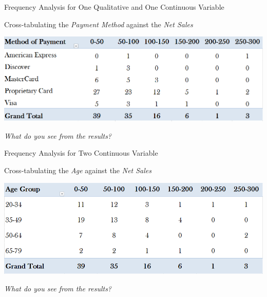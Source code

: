 \documentclass{beamer}
\begin{document}
\begin{frame}{Frequency Analysis for One Qualitative and One Continuous Variable}

\begin{center}
Cross-tabulating the \textit{Payment Method} against the \textit{Net Sales}

\vspace{0.3 cm}

\includegraphics[scale=0.4]{images/ch2CrossTabQualitativeContinuous.png}

\vspace{0.5 cm}

\textit{What do you see from the results?}

\end{center}



\end{frame}

\begin{frame}{Frequency Analysis for Two Continuous Variable}


\begin{center}
Cross-tabulating the \textit{Age} against the \textit{Net Sales}

\vspace{0.3 cm}

\includegraphics[scale=0.4]{images/ch2CrossTabContinuous.png}

\vspace{0.5 cm}

\textit{What do you see from the results?}

\end{center}


\end{frame}
\end{document}
